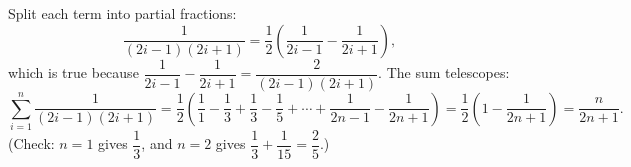 Split each term into partial fractions:
\[\dfrac{1}{(2i-1)(2i+1)}=\dfrac12\left(\dfrac1{2i-1}-\dfrac1{2i+1}\right),\]
which is true because $\dfrac1{2i-1}-\dfrac1{2i+1}=\dfrac{2}{(2i-1)(2i+1)}$. The sum telescopes:
\[\sum_{i=1}^{n}\dfrac{1}{(2i-1)(2i+1)}=\dfrac12\left(\dfrac11-\dfrac13+\dfrac13-\dfrac15+\cdots+\dfrac1{2n-1}-\dfrac1{2n+1}\right)=\dfrac12\left(1-\dfrac1{2n+1}\right)=\boxed{\dfrac{n}{2n+1}}.\]
(Check: $n=1$ gives $\dfrac13$, and $n=2$ gives $\dfrac13+\dfrac1{15}=\dfrac25$.)

